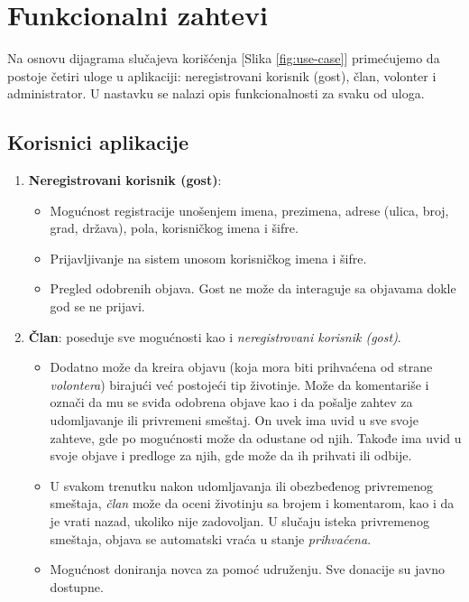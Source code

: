 \section{Funkcionalni zahtevi}
\par Na osnovu dijagrama slučajeva korišćenja [Slika \ref{fig:use-case}] primećujemo da postoje četiri uloge u aplikaciji: neregistrovani korisnik (gost), član, volonter i administrator. 
U nastavku se nalazi opis funkcionalnosti za svaku od uloga.
\subsection{Korisnici aplikacije}
\begin{enumerate}
    \item \textbf{Neregistrovani korisnik (gost)}: 
    \begin{itemize}
        \item Mogućnost registracije unošenjem imena, prezimena, adrese (ulica, broj, grad, država), pola, korisničkog imena i šifre.
        \item Prijavljivanje na sistem unosom korisničkog imena i šifre.
        \item Pregled odobrenih objava. Gost ne može da interaguje sa objavama dokle god se ne prijavi.
    \end{itemize}
    \item \textbf{Član}: poseduje sve mogućnosti kao i \textit{neregistrovani korisnik (gost)}. 
    \begin{itemize}
        \item Dodatno može da kreira objavu (koja mora biti prihvaćena od strane \textit{volontera}) birajući već postojeći tip životinje. Može da komentariše i označi da mu se sviđa odobrena 
        objave kao i da pošalje zahtev za udomljavanje ili privremeni smeštaj. On uvek ima uvid u sve svoje zahteve, gde po mogućnosti može da odustane od njih. Takođe ima uvid u svoje objave 
        i predloge za njih, gde može da ih prihvati ili odbije. 
        \item U svakom trenutku nakon udomljavanja ili obezbeđenog privremenog sme\-štaja, \textit{član} može da oceni životinju sa brojem i komentarom, kao i da je vrati nazad, ukoliko nije 
        zadovoljan. U slučaju isteka privremenog smeštaja, objava se automatski vraća u stanje \textit{prihvaćena}.
        \item Mogućnost doniranja novca za pomoć udruženju. Sve donacije su javno dostupne.
    \end{itemize}

\end{enumerate}
